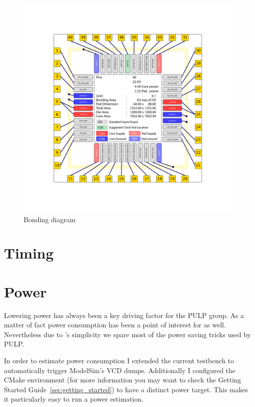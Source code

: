\begin{figure}[tb]
  \centering
  \includegraphics[width=\linewidth]{./figures/pad_instaces_img_ord}
  \caption{Bonding diagram}
  \label{fig:bonding_diagram}
\end{figure}

\section{Timing}


\section{Power}


Lowering power has always been a key driving factor for the PULP group. As a matter of fact power consumption has been a point of interest for \pulpino as well. Nevertheless due to \pulpino's simplicity we spare most of the power saving tricks used by PULP. 

In order to estimate power consumption I extended the current testbench to automatically trigger ModelSim's VCD dumps. Additionally I configured the CMake environment (for more information you may want to check the Getting Started Guide~\ref{sec:getting_started}) to have a distinct power target. This makes it particularly easy to run a power estimation.

